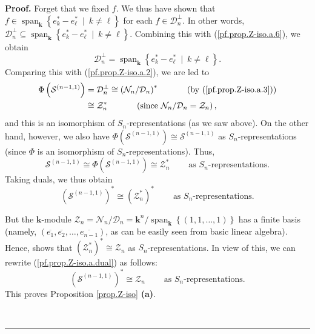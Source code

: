 \documentclass[numbers=enddot,12pt,final,onecolumn,notitlepage]{scrartcl}%
\theoremstyle{definition}
\newenvironment{proof}[1][Proof]{\noindent\textbf{#1.} }{\ \rule{0.5em}{0.5em}}
\begin{document}
\begin{proof}
Forget that we fixed $f$. We thus have shown that $f\in\operatorname*{span}%
\nolimits_{\mathbf{k}}\left\{  e_{k}^{\ast}-e_{\ell}^{\ast}\ \mid\ k\neq
\ell\right\}  $ for each $f\in\mathcal{D}_{n}^{\perp}$. In other words,
$\mathcal{D}_{n}^{\perp}\subseteq\operatorname*{span}\nolimits_{\mathbf{k}%
}\left\{  e_{k}^{\ast}-e_{\ell}^{\ast}\ \mid\ k\neq\ell\right\}  $. Combining
this with (\ref{pf.prop.Z-iso.a.6}), we obtain%
\[
\mathcal{D}_{n}^{\perp}=\operatorname*{span}\nolimits_{\mathbf{k}}\left\{
e_{k}^{\ast}-e_{\ell}^{\ast}\ \mid\ k\neq\ell\right\}  .
\]
Comparing this with (\ref{pf.prop.Z-iso.a.2}), we are led to%
\begin{align*}
\Phi\left(  \mathcal{S}^{\left(  n-1,1\right)  }\right)   &  =\mathcal{D}%
_{n}^{\perp}\cong\left(  \mathcal{N}_{n}/\mathcal{D}_{n}\right)  ^{\ast
}\ \ \ \ \ \ \ \ \ \ \left(  \text{by (\ref{pf.prop.Z-iso.a.3})}\right) \\
&  \cong\mathcal{Z}_{n}^{\ast}\ \ \ \ \ \ \ \ \ \ \left(  \text{since
}\mathcal{N}_{n}/\mathcal{D}_{n}=\mathcal{Z}_{n}\right)  ,
\end{align*}
and this is an isomorphism of $S_{n}$-representations (as we saw above). On
the other hand, however, we also have $\Phi\left(  \mathcal{S}^{\left(
n-1,1\right)  }\right)  \cong\mathcal{S}^{\left(  n-1,1\right)  }$ as $S_{n}%
$-representations (since $\Phi$ is an isomorphism of $S_{n}$-representations).
Thus,%
\[
\mathcal{S}^{\left(  n-1,1\right)  }\cong\Phi\left(  \mathcal{S}^{\left(
n-1,1\right)  }\right)  \cong\mathcal{Z}_{n}^{\ast}%
\ \ \ \ \ \ \ \ \ \ \text{as }S_{n}\text{-representations.}%
\]
Taking duals, we thus obtain%
\begin{equation}
\left(  \mathcal{S}^{\left(  n-1,1\right)  }\right)  ^{\ast}\cong\left(
\mathcal{Z}_{n}^{\ast}\right)  ^{\ast}\ \ \ \ \ \ \ \ \ \ \text{as }%
S_{n}\text{-representations.} \label{pf.prop.Z-iso.a.dual}%
\end{equation}


But the $\mathbf{k}$-module $\mathcal{Z}_{n}=\mathcal{N}_{n}/\mathcal{D}%
_{n}=\mathbf{k}^{n}/\operatorname*{span}\nolimits_{\mathbf{k}}\left\{  \left(
1,1,\ldots,1\right)  \right\}  $ has a finite basis (namely, $\left(
\overline{e_{1}},\overline{e_{2}},\ldots,\overline{e_{n-1}}\right)  $, as can
be easily seen from basic linear algebra). Hence, \cite[Proposition 5.19.22
\textbf{(b)}]{sga} shows that $\left(  \mathcal{Z}_{n}^{\ast}\right)  ^{\ast
}\cong\mathcal{Z}_{n}$ as $S_{n}$-representations. In view of this, we can
rewrite (\ref{pf.prop.Z-iso.a.dual}) as follows:%
\[
\left(  \mathcal{S}^{\left(  n-1,1\right)  }\right)  ^{\ast}\cong%
\mathcal{Z}_{n}\ \ \ \ \ \ \ \ \ \ \text{as }S_{n}\text{-representations.}%
\]
This proves Proposition \ref{prop.Z-iso} \textbf{(a)}. \medskip


\end{proof}
\end{document}
